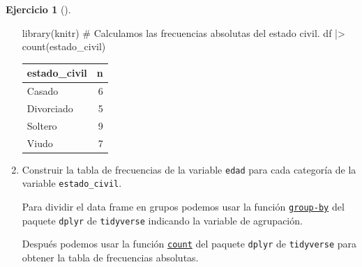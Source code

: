 \documentclass[
  spanish,
  a4paper,
]{scrreport}
\newenvironment{Shaded}{\begin{snugshade}}{\end{snugshade}}
\newcommand{\CommentTok}[1]{\textcolor[rgb]{0.37,0.37,0.37}{#1}}
\newcommand{\FunctionTok}[1]{\textcolor[rgb]{0.28,0.35,0.67}{#1}}
\newcommand{\NormalTok}[1]{\textcolor[rgb]{0.00,0.23,0.31}{#1}}
\newcommand{\SpecialCharTok}[1]{\textcolor[rgb]{0.37,0.37,0.37}{#1}}
\theoremstyle{definition}
\newtheorem{exercise}{Ejercicio}[chapter]
\theoremstyle{remark}
\begin{document}
\begin{exercise}[]
\begin{enumerate}
\begin{tcolorbox}
\begin{Shaded}
\begin{Highlighting}[]
\FunctionTok{library}\NormalTok{(knitr)}
\CommentTok{\# Calculamos las frecuencias absolutas del estado civil.}
\NormalTok{df }\SpecialCharTok{|\textgreater{}} \FunctionTok{count}\NormalTok{(estado\_civil)}
\end{Highlighting}
\end{Shaded}

  \begin{longtable}[]{@{}lr@{}}
  \toprule\noalign{}
  estado\_civil & n \\
  \midrule\noalign{}
  \endhead
  \bottomrule\noalign{}
  \endlastfoot
  Casado & 6 \\
  Divorciado & 5 \\
  Soltero & 9 \\
  Viudo & 7 \\
  \end{longtable}

  \end{tcolorbox}
\item
  Construir la tabla de frecuencias de la variable \texttt{edad} para
  cada categoría de la variable \texttt{estado\_civil}.

  \begin{tcolorbox}[enhanced jigsaw, titlerule=0mm, arc=.35mm, rightrule=.15mm, opacitybacktitle=0.6, leftrule=.75mm, colframe=quarto-callout-tip-color-frame, toptitle=1mm, breakable, colbacktitle=quarto-callout-tip-color!10!white, bottomrule=.15mm, colback=white, left=2mm, bottomtitle=1mm, opacityback=0, title=\textcolor{quarto-callout-tip-color}{\faLightbulb}\hspace{0.5em}{Solución}, toprule=.15mm, coltitle=black]

  Para dividir el data frame en grupos podemos usar la función
  \href{https://aprendeconalf.es/manual-r/06-preprocesamiento.html\#res\%C3\%BAmenes-por-grupos}{\texttt{group-by}}
  del paquete \texttt{dplyr} de \texttt{tidyverse} indicando la variable
  de agrupación.

  Después podemos usar la función
  \href{https://aprendeconalf.es/manual-r/06-preprocesamiento.html\#conteo-del-n\%C3\%BAmero-de-observaciones}{\texttt{count}}
  del paquete \texttt{dplyr} de \texttt{tidyverse} para obtener la tabla
  de frecuencias absolutas.


\end{tcolorbox}
\end{enumerate}
\end{exercise}
\end{document}
